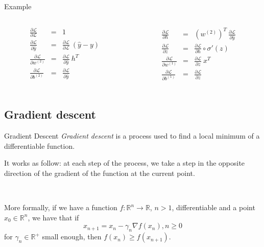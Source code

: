 \documentclass[11pt]{beamer}
\begin{document}
\begin{frame}{Example}


 \begin{columns}[t]
  \begin{column}{5cm}
    \begin{eqnarray*}
\frac{\partial \mathcal{L}}{\partial \mathcal{L}} & = & 1 \\
\frac{\partial \mathcal{L}}{\partial \hat{y}} & = & \frac{\partial \mathcal{L}}{\partial \mathcal{L}} \ (\hat{y} - y) \\
\frac{\partial \mathcal{L}}{\partial w^{(2)}} & = & \frac{\partial \mathcal{L}}{\partial \hat{y}}\ h^T \\
\frac{\partial \mathcal{L}}{\partial b^{(2)}} & = & \frac{\partial \mathcal{L}}{\partial \hat{y}}
\end{eqnarray*}
  \end{column}
  
  \begin{column}{5cm}
    \begin{eqnarray*}
    \frac{\partial \mathcal{L}}{\partial h} & = &  (w^{(2)})^T\ \frac{\partial \mathcal{L}}{\partial \hat{y}} \\
\frac{\partial \mathcal{L}}{\partial z} & = & \frac{\partial \mathcal{L}}{\partial h} \circ \sigma '(z) \\
\frac{\partial \mathcal{L}}{\partial w^{(1)}} & = & \frac{\partial \mathcal{L}}{\partial z}\ x^T \\
\frac{\partial \mathcal{L}}{\partial b^{(1)}} & = & \frac{\partial \mathcal{L}}{\partial z} \\
\end{eqnarray*}
  \end{column}
 \end{columns} 

\end{frame}

\subsection{Gradient descent}
\begin{frame}{Gradient Descent}
\textit{Gradient descent} \cite{10} is a process used to find a local minimum of a differentiable function. 

It works as follow: at each step of the process, we take a step in the opposite direction of the gradient of the function at the current point.

~

More formally, if we have a function $f: \mathbb{R}^n \rightarrow \mathbb{R}$, $n>1$, differentiable and a point $x_0\in \mathbb{R}^n$, we have that if
$$
x_{n+1} = x_n -\gamma_n \nabla f(x_n), n\geq 0
$$
for $\gamma_n \in \mathbb{R}^+$ small enough, then $f(x_n) \geq f(x_{n+1})$. 

\end{frame}
\end{document}
